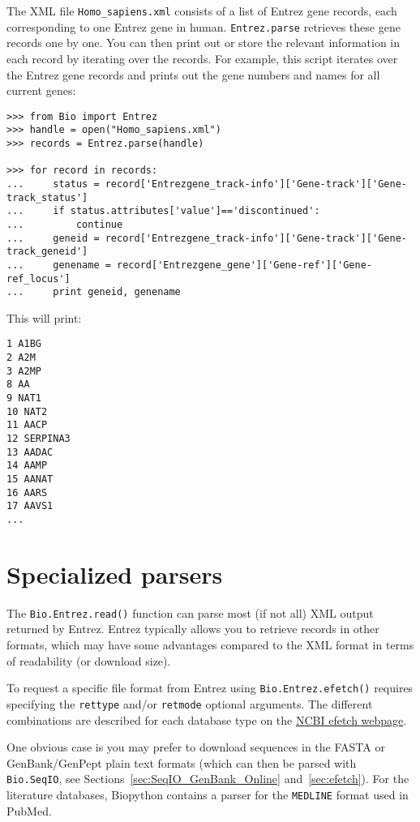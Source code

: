 \documentclass{report}
\begin{document}
The XML file \verb+Homo_sapiens.xml+ consists of a list of Entrez gene records, each corresponding to one Entrez gene in human. \verb+Entrez.parse+ retrieves these gene records one by one. You can then print out or store the relevant information in each record by iterating over the records. For example, this script iterates over the Entrez gene records and prints out the gene numbers and names for all current genes:

\begin{verbatim}
>>> from Bio import Entrez
>>> handle = open("Homo_sapiens.xml")
>>> records = Entrez.parse(handle)

>>> for record in records:
...     status = record['Entrezgene_track-info']['Gene-track']['Gene-track_status']
...     if status.attributes['value']=='discontinued':
...         continue
...     geneid = record['Entrezgene_track-info']['Gene-track']['Gene-track_geneid']
...     genename = record['Entrezgene_gene']['Gene-ref']['Gene-ref_locus']
...     print geneid, genename
\end{verbatim}

This will print:
\begin{verbatim}
1 A1BG
2 A2M
3 A2MP
8 AA
9 NAT1
10 NAT2
11 AACP
12 SERPINA3
13 AADAC
14 AAMP
15 AANAT
16 AARS
17 AAVS1
...
\end{verbatim}


\section{Specialized parsers}
\label{sec:entrez-specialized-parsers}

The \verb|Bio.Entrez.read()| function can parse most (if not all) XML output returned by Entrez. Entrez typically allows you to retrieve records in other formats, which may have some advantages compared to the XML format in terms of readability (or download size).

To request a specific file format from Entrez using \verb|Bio.Entrez.efetch()| requires specifying the \verb|rettype| and/or \verb|retmode| optional arguments.  The different combinations are described for each database type on the \href{http://www.ncbi.nlm.nih.gov/entrez/query/static/efetch_help.html}{NCBI efetch webpage}.

One obvious case is you may prefer to download sequences in the FASTA or GenBank/GenPept plain text formats (which can then be parsed with \verb|Bio.SeqIO|, see Sections~\ref{sec:SeqIO_GenBank_Online} and~\ref{sec:efetch}).  For the literature databases, Biopython contains a parser for the \verb+MEDLINE+ format used in PubMed.
\end{document}
